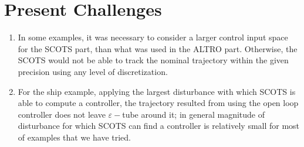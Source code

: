 


\section{Present Challenges}

\begin{enumerate}
	\item In some examples, it was necessary to consider a larger control input space for the SCOTS part, than what was used in the ALTRO part.
	Otherwise, the SCOTS would not be able to track the nominal trajectory within the given precision using any level of discretization. 
	\item For the ship example, applying the largest disturbance with which SCOTS is able to compute a controller, the trajectory resulted from using the open loop controller does not leave  $\varepsilon-$tube around it; in general magnitude of disturbance for which SCOTS can find a controller is relatively small for most of examples that we have tried.
\end{enumerate}




